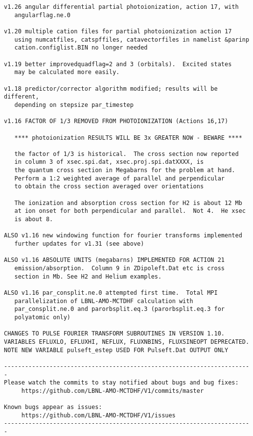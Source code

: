 \begin{verbatim}
v1.26 angular differential partial photoionization, action 17, with
   angularflag.ne.0

v1.20 multiple cation files for partial photoionization action 17
   using numcatfiles, catspffiles, catavectorfiles in namelist &parinp
   cation.configlist.BIN no longer needed

v1.19 better improvedquadflag=2 and 3 (orbitals).  Excited states
   may be calculated more easily.

v1.18 predictor/corrector algorithm modified; results will be different,
   depending on stepsize par_timestep

v1.16 FACTOR OF 1/3 REMOVED FROM PHOTOIONIZATION (Actions 16,17)

   **** photoionization RESULTS WILL BE 3x GREATER NOW - BEWARE ****

   the factor of 1/3 is historical.  The cross section now reported
   in column 3 of xsec.spi.dat, xsec.proj.spi.datXXXX, is
   the quantum cross section in Megabarns for the problem at hand.
   Perform a 1:2 weighted average of parallel and perpendicular
   to obtain the cross section averaged over orientations

   The ionization and absorption cross section for H2 is about 12 Mb 
   at ion onset for both perpendicular and parallel.  Not 4.  He xsec
   is about 8.

ALSO v1.16 new windowing function for fourier transforms implemented
   further updates for v1.31 (see above)

ALSO v1.16 ABSOLUTE UNITS (megabarns) IMPLEMENTED FOR ACTION 21
   emission/absorption.  Column 9 in ZDipoleft.Dat etc is cross 
   section in Mb. See H2 and Helium examples.

ALSO v1.16 par_consplit.ne.0 attempted first time.  Total MPI 
   parallelization of LBNL-AMO-MCTDHF calculation with
   par_consplit.ne.0 and parorbsplit.eq.3 (parorbsplit.eq.3 for 
   polyatomic only)

CHANGES TO PULSE FOURIER TRANSFORM SUBROUTINES IN VERSION 1.10.
VARIABLES EFLUXLO, EFLUXHI, NEFLUX, FLUXNBINS, FLUXSINEOPT DEPRECATED.
NOTE NEW VARIABLE pulseft_estep USED FOR Pulseft.Dat OUTPUT ONLY

-----------------------------------------------------------------------
Please watch the commits to stay notified about bugs and bug fixes:
     https://github.com/LBNL-AMO-MCTDHF/V1/commits/master

Known bugs appear as issues:
     https://github.com/LBNL-AMO-MCTDHF/V1/issues
-----------------------------------------------------------------------


\end{verbatim}
